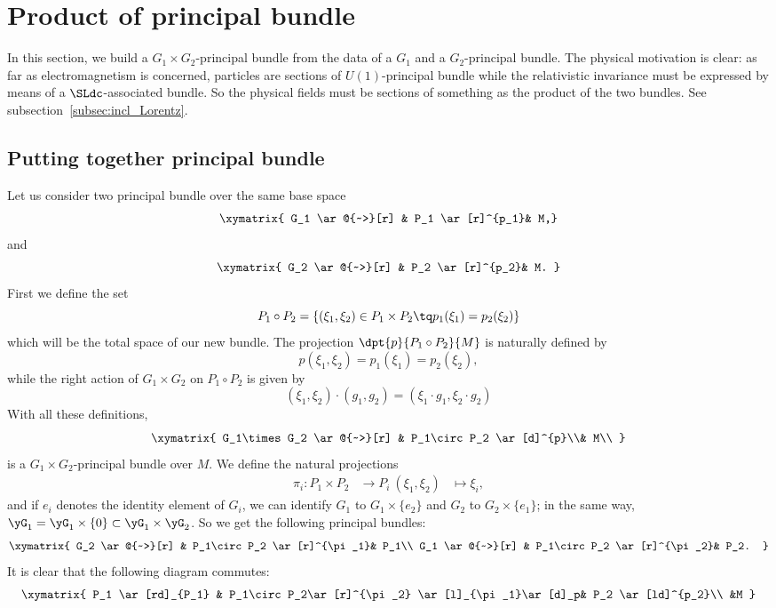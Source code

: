 \section{Product of principal bundle}\label{sec:produit_bundle}

In this section, we build a $G_1\times G_2$-principal bundle from the data of a $G_1$ and a $G_2$-principal bundle. The physical motivation is clear: as far as electromagnetism is concerned, particles are sections of $U(1)$-principal bundle while the relativistic invariance must be expressed by means of a $\SLdc$-associated bundle. So the physical fields must be sections of something as the product of the two bundles. See subsection~\ref{subsec:incl_Lorentz}.

\subsection{Putting together principal bundle}

Let us consider two principal bundle over the same base space
\[
\xymatrix{
    G_1  \ar@{~>}[r] & P_1 \ar[r]^{p_1}& M,}
\]
and
\[
\xymatrix{
    G_2  \ar@{~>}[r] & P_2 \ar[r]^{p_2}& M.
  }
\]
First we define the set
\begin{equation}
  P_1\circ P_2=\{   (\xi_1,\xi_2)\in P_1\times P_2\tq p_1(\xi_1)=p_2(\xi_2)    \}
\end{equation}
which will be the total space of our new bundle. The projection $\dpt{p}{P_1\circ P_2}{M}$ is naturally defined by
\[
  p(\xi_1,\xi_2)=p_1(\xi_1)=p_2(\xi_2),
\]
while the right action of $G_1\times G_2$ on $P_1\circ P_2$ is given by
\[
  (\xi_1,\xi_2)\cdot(g_1,g_2)=(\xi_1\cdot g_1,\xi_2\cdot g_2)
\]
With all these definitions,
\[
\xymatrix{
    G_1\times G_2  \ar@{~>}[r] & P_1\circ P_2 \ar[d]^{p}\\& M\\
  }
\]
is a $G_1\times G_2$-principal bundle over $M$. We define the natural projections
		\begin{equation}
		\begin{aligned}
			\pi_i \colon P_1\times P_2 &\to P_i\
			(\xi_1, \xi_2)&\mapsto \xi_i,
		\end{aligned}
	\end{equation}
%
and if $e_i$ denotes the identity element of $G_i$, we can identify $G_1$ to $G_1\times \{e_2\}$ and $G_2$ to $G_2\times \{e_1\}$; in the same way, $\yG_1=\yG_1\times\{0\}\subset\yG_1\times\yG_2$. So we get the following principal bundles:
\[
\xymatrix{
    G_2  \ar@{~>}[r] & P_1\circ P_2 \ar[r]^{\pi_1}& P_1\\
    G_1  \ar@{~>}[r] & P_1\circ P_2 \ar[r]^{\pi_2}& P_2.
  }
\]
It is clear that the following diagram commutes:
\[
\xymatrix{
    P_1  \ar[rd]_{P_1} & P_1\circ P_2\ar[r]^{\pi_2} \ar[l]_{\pi_1}\ar[d]_p& P_2 \ar[ld]^{p_2}\\
    &M
  }
\]

